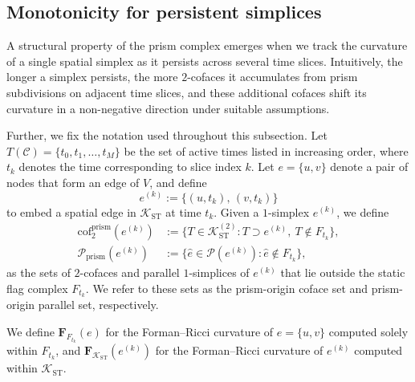 \documentclass[
    pre,
    twocolumn,
    superscriptaddress,
    showpacs,
    nofootinbib,
    amsmath,
    amssymb,
    floatfix
]{revtex4-2}
\newcommand{\K}{\mathcal{K}}
\newcommand{\F}{\mathbf{F}}        %
\theoremstyle{plain} %
\theoremstyle{definition} %
\begin{document}
\subsection{Monotonicity for persistent simplices}\label{ssec:monotonicity}

A structural property of the prism complex emerges when we track the curvature of a single spatial simplex as it persists across several time slices.
Intuitively, the longer a simplex persists, the more $2$-cofaces it accumulates from prism subdivisions on adjacent time slices, and these additional cofaces shift its curvature in a non-negative direction under suitable assumptions.

Further, we fix the notation used throughout this subsection.
Let $T(\mathcal{C}) = \{t_0, t_1, \ldots, t_M\}$ be the set of active times listed in increasing order, where $t_k$ denotes the time corresponding to slice index $k$.
Let $e = \{u, v\}$ denote a pair of nodes that form an edge of $V$, and define
\begin{equation*}\label{eq:embedding}
e^{(k)} := \{(u, t_k),\,(v, t_k)\}
\end{equation*}
to embed a spatial edge in $\K_{\mathrm{ST}}$ at time $t_k$.
Given a $1$-simplex $e^{(k)}$, we define
\begin{align*}
\mathrm{cof}_2^{\mathrm{prism}}(e^{(k)}) &:= \{T \in \K_{\mathrm{ST}}^{(2)} : T \supset e^{(k)},\ T \notin F_{t_k}\},\\
\mathcal{P}_{\mathrm{prism}}(e^{(k)}) &:= \{\hat e \in \mathcal{P}(e^{(k)}) : \hat e \notin F_{t_k}\}, 
\end{align*}
as the sets of $2$-cofaces and parallel $1$-simplices of $e^{(k)}$ that lie outside the static flag complex $F_{t_k}$.
We refer to these sets as the prism-origin coface set and prism-origin parallel set, respectively.

We define $\F_{F_{t_k}}(e)$ for the Forman--Ricci curvature of $e = \{u, v\}$ computed solely within $F_{t_k}$, and $\F_{\K_{\mathrm{ST}}}(e^{(k)})$ for the Forman--Ricci curvature of $e^{(k)}$ computed within $\K_{\mathrm{ST}}$.
\end{document}
